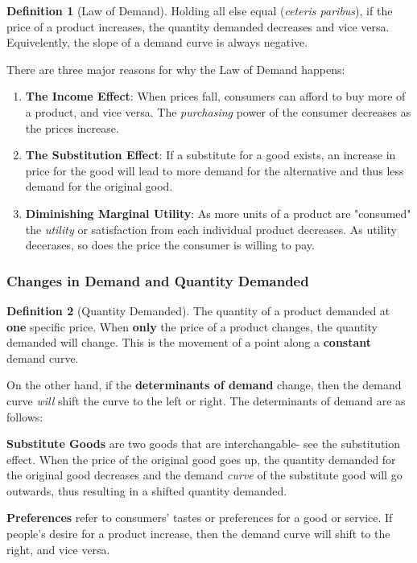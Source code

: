 \documentclass[12pt, a4paper]{article}
\theoremstyle{definition}
\newtheorem{definition}{Definition}
\begin{document}
\begin{definition}[Law of Demand]
    Holding all else equal (\textit{ceteris paribus}), if the price of a product increases, the quantity demanded decreases and vice versa.
    Equivelently, the slope of a demand curve is always negative.
\end{definition}

There are three major reasons for why the Law of Demand happens:
\begin{enumerate}
    \item \textbf{The Income Effect}: When prices fall, consumers can afford to buy more of a product, and vice versa. The \textit{purchasing} power of the consumer decreases as the prices increase.
    \item \textbf{The Substitution Effect}: If a substitute for a good exists, an increase in price for the good will lead to more demand for the alternative and thus less demand for the original good.
    \item \textbf{Diminishing Marginal Utility}: As more units of a product are "consumed" the \textit{utility} or satisfaction from each individual product decreases. As utility decerases, so does the price the consumer is willing to pay.
\end{enumerate}

\subsubsection{Changes in Demand and Quantity Demanded}
\begin{definition}[Quantity Demanded]
    The quantity of a product demanded at \textbf{one} specific price.
    When \textbf{only} the price of a product changes, the quantity demanded will change.
    This is the movement of a point along a \textbf{constant} demand curve.
\end{definition}

On the other hand, if the \textbf{determinants of demand} change, then the demand curve \textit{will} shift the curve to the left or right.
The determinants of demand are as follows:

\textbf{Substitute Goods} are two goods that are interchangable- see the substitution effect.
When the price of the original good goes up, the quantity demanded for the original good decreases and the demand \textit{curve} of the substitute good will go outwards, thus resulting in a shifted quantity demanded.

\textbf{Preferences} refer to consumers' tastes or preferences for a good or service.
If people's desire for a product increase, then the demand curve will shift to the right, and vice versa.
\end{document}
